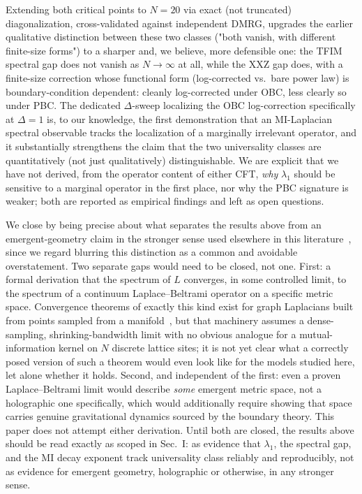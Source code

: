 \documentclass[aps,prx,reprint,amsmath,amssymb,superscriptaddress]{revtex4-2}
\begin{document}
Extending both critical points to $N=20$ via exact (not truncated) diagonalization, cross-validated
against independent DMRG, upgrades the earlier qualitative distinction between these two classes
("both vanish, with different finite-size forms") to a sharper and, we believe, more defensible one:
the TFIM spectral gap does not vanish as $N\to\infty$ at all, while the XXZ gap does, with a
finite-size correction whose functional form (log-corrected vs.\ bare power law) is boundary-condition
dependent: cleanly log-corrected under OBC, less clearly so under PBC. The dedicated $\Delta$-sweep
localizing the OBC log-correction specifically at $\Delta=1$ is, to our knowledge, the first
demonstration that an MI-Laplacian spectral observable tracks the localization of a marginally
irrelevant operator, and it substantially strengthens the claim that the two universality classes
are quantitatively (not just qualitatively) distinguishable. We are explicit that we have not
derived, from the operator content of either CFT, \emph{why} $\lambda_1$ should be sensitive to a
marginal operator in the first place, nor why the PBC signature is weaker; both are reported as
empirical findings and left as open questions.

We close by being precise about what separates the results above from an emergent-geometry claim in
the stronger sense used elsewhere in this literature~\cite{VanRaamsdonk2010,RyuTakayanagi2006,Swingle2012},
since we regard blurring this distinction as a common and avoidable overstatement. Two separate gaps
would need to be closed, not one. First: a formal derivation that the spectrum of $L$ converges, in
some controlled limit, to the spectrum of a continuum Laplace--Beltrami operator on a specific metric
space. Convergence theorems of exactly this kind exist for graph Laplacians built from points sampled
from a manifold~\cite{BelkinNiyogi2003,vonLuxburg2007}, but that machinery assumes a dense-sampling,
shrinking-bandwidth limit with no obvious analogue for a mutual-information kernel on $N$ discrete
lattice sites; it is not yet clear what a correctly posed version of such a theorem would even look
like for the models studied here, let alone whether it holds. Second, and independent of the first:
even a proven Laplace--Beltrami limit would describe \emph{some} emergent metric space, not a
holographic one specifically, which would additionally require showing that space carries genuine
gravitational dynamics sourced by the boundary theory. This paper does not attempt either derivation.
Until both are closed, the results above should be read exactly as scoped in Sec.~I: as evidence that
$\lambda_1$, the spectral gap, and the MI decay exponent track universality class reliably and
reproducibly, not as evidence for emergent geometry, holographic or otherwise, in any stronger sense.
\end{document}
